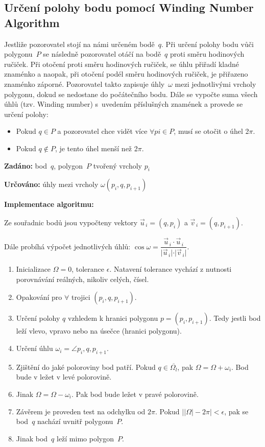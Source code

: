 \documentclass[a4paper, 12pt, oneside, titlepage]{article} %
\begin{document}
\subsection{Určení polohy bodu pomocí Winding Number Algorithm} \label{winding}
Jestliže pozorovatel stojí na námi určeném bodě~$q$. Při určení polohy bodu vůči polygonu~$P$ se následně pozorovatel otáčí na bodě~$q$ proti směru hodinových ručiček. Při otočení proti směru hodinových ručiček, se úhlu přiřadí kladné znaménko a naopak, při otočení podél směru hodinových ručiček, je přiřazeno znaménko záporné. Pozorovatel takto zapisuje úhly~$\omega$ mezi jednotlivými vrcholy polygonu, dokud se nedostane do počátečního bodu. Dále se vypočte suma všech úhlů (tzv. Winding number) s~uvedením příslušných znamének a provede se určení polohy: 
\begin{itemize}
\item Pokud $q \in P$ a pozorovatel chce vidět více $\forall pi \in P$, musí se otočit o úhel 2$\pi$.
\item Pokud $q \notin P$, je tento úhel menší než 2$\pi$.
\end{itemize}


\noindent\textbf{Zadáno:} bod~$q$, polygon~$P$ tvořený vrcholy $p_i$

\noindent\textbf{Určováno:} úhly mezi vrcholy $\omega(p_i,q,p_{i+1} )$

\noindent\textbf{Implementace algoritmu:}

Ze souřadnic bodů jsou vypočteny vektory $\vec{u}_{\,i} = (q,p_i)$ a $\vec{v}_{\,i} = (q,p_{i+1})$. 

Dále probíhá výpočet jednotlivých úhlů: $\cos\omega = \dfrac{\vec{u}_{\,i}\cdot\vec{u}_{\,i}}{\vert\vec{u}_{\,i}\vert\cdot\vert\vec{v}_{\,i}\vert}$.

\begin{enumerate}
  \item Inicializace $\Omega = 0$, tolerance $\epsilon$. Natavení tolerance vychází z nutnosti porovnávání reálných, nikoliv celých, čísel.
  \item Opakování pro $\forall$ trojici $(p_i,q,p_{i+1} )$.
  \item \quad Určení polohy $q$ vzhledem k hranici polygonu $p = (p_i, p_{i+1})$. Tedy jestli bod leží vlevo, vpravo nebo na úsečce (hranici polygonu).
  \item \quad Určení úhlu $\omega_i = \angle p_i,q, p_{i+1}$.
  \item \quad Zjištění do jaké poloroviny bod patří. Pokud $q \in \overline{\Omega_l}$, pak $\Omega = \Omega + \omega_i$. Bod bude v ležet v levé polorovině.
  \item \quad Jinak $\Omega = \Omega - \omega_i$. Pak bod bude ležet v pravé polorovině. 
  \item Závěrem je proveden test na odchylku od $2\pi$. Pokud $\vert\vert\Omega\vert - 2\pi\vert < \epsilon$, pak se bod~$q$ nachází uvnitř polygonu~$P$.
  \item Jinak bod~$q$ leží mimo polygon~$P$.
\end{enumerate}
\end{document}
